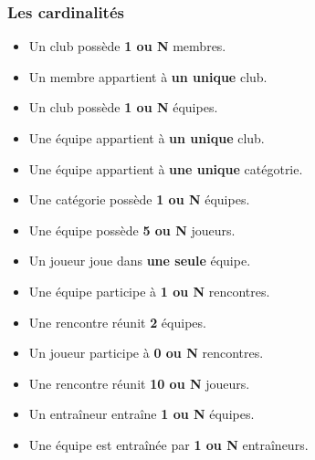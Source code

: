 \documentclass{article}
\begin{document}
\subsubsection*{Les cardinalités}
\begin{itemize}
\item Un club possède \textbf{1 ou N} membres. \\

\item Un membre appartient à \textbf{un unique} club. \\

\item Un club possède \textbf{1 ou N} équipes. \\

\item Une équipe appartient à \textbf{un unique} club. \\

\item Une équipe appartient à \textbf{une unique} catégotrie. \\

\item Une catégorie possède \textbf{1 ou N} équipes. \\

\item Une équipe possède \textbf{5 ou N} joueurs. \\

\item Un joueur joue dans \textbf{une seule} équipe. \\

\item Une équipe participe à \textbf{1 ou N} rencontres. \\

\item Une rencontre réunit \textbf{2} équipes. \\

\item Un joueur participe à \textbf{0 ou N} rencontres. \\

\item Une rencontre réunit \textbf{10 ou N} joueurs. \\

\item Un entraîneur entraîne \textbf{1 ou N} équipes. \\

\item Une équipe est entraînée par \textbf{1 ou N} entraîneurs. \\
\end{itemize}
\end{document}
